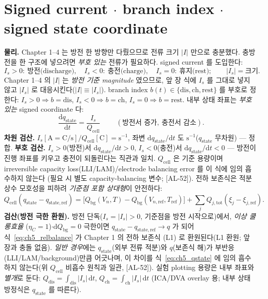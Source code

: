 \documentclass[11pt,a4paper]{article}
\newcommand{\dd}{\mathrm{d}}
\newcommand{\bg}{\mathrm{bg}}
\newcommand{\cell}{\mathrm{cell}}
\newcommand{\tot}{\mathrm{tot}}
\newcommand{\dis}{\mathrm{dis}}
\newcommand{\chg}{\mathrm{ch}}
\newcommand{\rst}{\mathrm{rest}}
\newcommand{\stt}{\mathrm{state}}
\newcommand{\AL}[1]{\textsf{[AL-#1]}}
\begin{document}
\section{Signed current $\cdot$ branch index $\cdot$ signed state coordinate}\label{sec:ch5_signed}
\textbf{물리.} Chapter 1--4 는 방전 한 방향만 다뤘으므로 전류 크기 $|I|$ 만으로 충분했다. 충방전을 한 구조에
넣으려면 \emph{부호 있는} 전류가 필요하다. signed current 를 도입한다:
\begin{equation}
I_s>0:\ \text{방전(discharge)},\quad I_s<0:\ \text{충전(charge)},\quad I_s=0:\ \text{휴지(rest)};\qquad |I_s|=\text{크기}.
\label{eq:ch5_signed_current}
\end{equation}
Chapter 1--4 의 $|I|$ 는 \emph{방전 기준 magnitude} 였으므로, 앞 장 식에 $I_s$ 를 그대로 넣지 않고 $|I_s|$ 로
대응시킨다($|I|\equiv|I_s|$). branch index $b(t)\in\{\dis,\chg,\rst\}$ 를 부호로 정한다:
$I_s>0\Rightarrow b=\dis$, $I_s<0\Rightarrow b=\chg$, $I_s=0\Rightarrow b=\rst$. 내부 상태 좌표는 \emph{부호
있는} signed coordinate 다:
\begin{equation}
\boxed{\;\frac{\dd q_\stt}{\dd t}=\frac{I_s}{Q_\cell}\;}\qquad(\text{방전서 증가},\ \text{충전서 감소}).
\label{eq:ch5_qstate}
\end{equation}
\textbf{차원 검산.} $I_s[\mathrm A=\mathrm{C/s}]/Q_\cell[\mathrm C]=\mathrm{s^{-1}}$, 좌변 $\dd q_\stt/\dd t$ 도
$\mathrm{s^{-1}}$($q_\stt$ 무차원) — 정합. \textbf{부호 검산.} $I_s>0$(방전)서 $\dd q_\stt/\dd t>0$,
$I_s<0$(충전)서 $\dd q_\stt/\dd t<0$ — 방전이 진행 좌표를 키우고 충전이 되돌린다는 직관과 일치. $Q_\cell$ 은
기준 용량이며 irreversible capacity loss(LLI/LAM)/electrode balancing error 를 이 식에 임의 흡수하지 않는다
(필요 시 별도 capacity-balancing 변수; \AL{52}). 전하 보존식은 적분 상수 모호성을 피하려 \emph{기준점 포함
상대형}이 안전하다:
\begin{equation}
Q_\cell(q_\stt-q_{\stt,\mathrm{ref}})=\big[Q_\bg(V_n,T)-Q_\bg(V_{n,\mathrm{ref}},T_{\mathrm{ref}})\big]
+\sum_j Q_{j,\tot}(\xi_j-\xi_{j,\mathrm{ref}}).
\label{eq:ch5_relbalance}
\end{equation}
\textbf{검산(방전 극한 환원).} 방전 단독($I_s=|I_s|>0$, 기준점을 방전 시작으로)에서, \emph{이상 쿨롱효율}
($\eta_C=1$)$\cdot$$\dd Q_\bg=0$ 극한이면 $q_\stt-q_{\stt,\mathrm{ref}}\to q$ 가 되어 식~\eqref{eq:ch5_relbalance}
가 Chapter 1 의 전하 보존식 (L1) 로 환원된다(L1 환원; 앞 장과 충돌 없음). \emph{일반 경우}에는 $q_\stt$(외부
전류 적분)와 $q$(보존식 해)가 부반응(LLI/LAM/background)만큼 어긋나며, 이 차이를 식~\eqref{eq:ch5_qstate} 에
임의 흡수하지 않는다(위 $Q_\cell$ 비흡수 원칙과 일관, \AL{52}). 실험 plotting 용량은 내부 좌표와 \emph{별개}로 둔다: $Q_\dis=\int_\dis|I_s|\,\dd t$,
$Q_\chg=\int_\chg|I_s|\,\dd t$ (ICA/DVA overlay 용; 내부 상태방정식은 $q_\stt$ 를 따른다).
\end{document}
